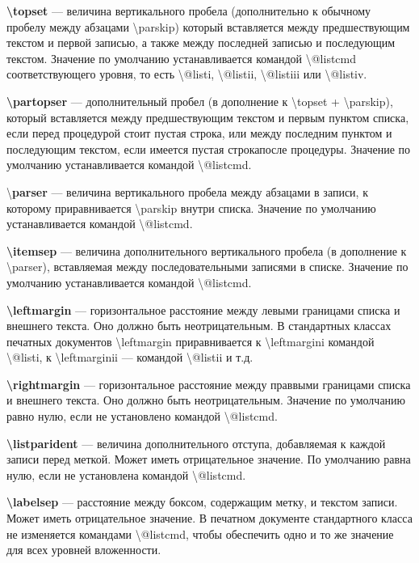 \documentclass[a4paper,14pt,russian]{extreport}
\begin{document}
\bigskip

\textbf{\textbackslash topset} --- величина вертикального пробела (дополнительно к обычному пробелу между абзацами \textbackslash parskip) который вставляется между предшествующим текстом и первой записью, а также между последней записью и последующим текстом. Значение по умолчанию устанавливается командой \textbackslash @listcmd соответствующего уровня, то есть \textbackslash @listi, \textbackslash @listii, \textbackslash @listiii или \textbackslash @listiv.

\textbf{\textbackslash partopser} --- дополнительный пробел (в дополнение к \textbackslash topset + \textbackslash parskip), который вставляется между предшествующим текстом и первым пунктом списка, если перед процедурой стоит пустая строка, или между последним пунктом и последующим текстом, если имеется пустая строкапосле процедуры. Значение по умолчанию устанавливается командой \textbackslash @listcmd.

\textbackslash \textbf{parser} --- величина вертикального пробела между абзацами в записи, к которому приравнивается \textbackslash parskip внутри списка. Значение по умолчанию устанавливается командой \textbackslash @listcmd.

\textbf{\textbackslash itemsep}  --- величина дополнительного вертикального пробела (в дополнение к \textbackslash parser), вставляемая между последовательными записями в списке. Значение по умолчанию устанавливается командой \textbackslash @listcmd.

\textbf{\textbackslash leftmargin}  --- горизонтальное расстояние между левыми границами списка и внешнего текста. Оно должно быть неотрицательным. В стандартных классах печатных документов \textbackslash leftmargin приравнивается к \textbackslash leftmargini командой \textbackslash @listi, к \textbackslash leftmarginii --- командой \textbackslash @listii и т.д.

\textbf{\textbackslash rightmargin}  --- горизонтальное расстояние между праввыми границами списка и внешнего текста. Оно должно быть неотрицательным. Значение по умолчанию равно нулю, если не установлено командой \textbackslash @listcmd.

\textbf{\textbackslash listparident }--- величина дополнительного отступа, добавляемая к каждой записи перед меткой. Может иметь отрицательное значение. По умолчанию равна нулю, если не установлена командой \textbackslash @listcmd.

\textbf{\textbackslash labelsep }--- расстояние между боксом, содержащим метку, и текстом записи. Может иметь отрицательное значение. В печатном документе стандартного класса не изменяется командами \textbackslash @listcmd, чтобы обеспечить одно и то же значение для всех уровней вложенности.
\end{document}
